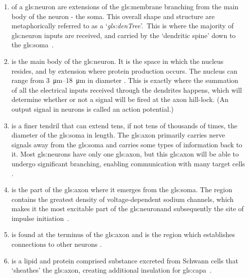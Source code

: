 \documentclass[class={myRUCProject}, crop=false]{standalone}
\begin{document}
\begin{enumerate}
    \item {} of a \gls{gls:neuron} are extensions of the \gls{gls:membrane} branching from the main body of the neuron - the soma. This overall shape and structure are metaphorically referred to as a `\textit{\gls{gls:denTree}}'.\footnotemark~This is where the majority of \gls{gls:neuron} inputs are received, and carried by the `dendritic spine' down to the \gls{gls:soma}~\cite{Hammond2015ch3,Hammond2015ch4}. 
    \item {} is the main body of the \gls{gls:neuron}. It is the space in which the nucleus resides, and by extension where protein production occurs. The nucleus can range from \qtyrange{3}{18}{\um} in diameter \cite{Hammond2015ch3,Hammond2015ch4}. This is exactly where the summation of all the electrical inputs received through the dendrites happens, which will determine whether or not a signal will be fired at the axon hill-lock. (An output signal in neurons is called an action potential.)
    \item {} is a finer tendril that can extend tens, if not tens of thousands of times, the diameter of the \gls{gls:soma} in length. The \gls{gls:axon} primarily carries nerve signals away from the \gls{gls:soma} and carries some types of information back to it. Most \glspl{gls:neuron} have only one \gls{gls:axon}, but this \gls{gls:axon} will be able to undergo significant branching, enabling communication with many target cells \cite{Hammond2015ch3,Hammond2015ch4}. 
    \item {} is the part of the \gls{gls:axon} where it emerges from the \gls{gls:soma}. The region contains the greatest density of voltage-dependent sodium channels, which makes it the most excitable part of the \gls{gls:neuron}and subsequently the site of impulse initiation~\cite{Hammond2015ch3,Hammond2015ch4}. 
    \item {} is found at the terminus of the \gls{gls:axon} and is the region which establishes connections to other neurons  \cite{Hammond2015ch3,Hammond2015ch4}. 
    \item {} is a lipid and protein comprised substance excreted from Schwann cells\alextodo{} that `sheathes' the \gls{gls:axon}, creating additional insulation for \gls{gls:capa}~\cite{Hammond2015ch4}.
\end{enumerate}
\end{document}
